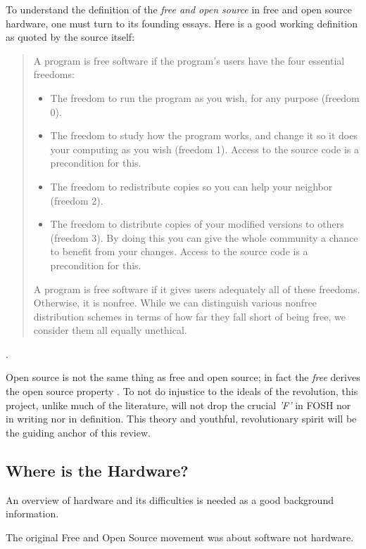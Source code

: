 \documentclass{article}
\begin{document}
To understand the definition of the \textit{free and open source} in free and open source hardware, one must turn to its founding essays. Here is a good working definition as quoted by the source itself:

\begin{quote}
    A program is free software if the program’s users have the four essential freedoms:

    \begin{itemize}
        \item The freedom to run the program as you wish, for any purpose (freedom 0).
        \item The freedom to study how the program works, and change it so it does your computing as you wish (freedom 1). 
            Access to the source code is a precondition for this.
        \item The freedom to redistribute copies so you can help your neighbor (freedom 2).
        \item The freedom to distribute copies of your modified versions to others (freedom 3). 
            By doing this you can give the whole community a chance to benefit from your changes. Access to the source code is a precondition for this.
    \end{itemize}
    A program is free software if it gives users adequately all of these freedoms. Otherwise, it is nonfree. 
    While we can distinguish various nonfree distribution schemes in terms of how far they fall short of being free, we consider them all equally unethical.
\end{quote} \cite{b0_stallman}.

Open source is not the same thing as free and open source; in fact the \textit{free} derives the open source property \cite{b0_stallman}. 
To not do injustice to the ideals of the revolution, this project, unlike much of the literature, will not drop the crucial \textit{'F'} in FOSH nor in writing nor in definition.
This theory and youthful, revolutionary spirit will be the guiding anchor of this review.

\subsection{Where is the Hardware?}
An overview of hardware and its difficulties is needed as a good background information. 

The original Free and Open Source movement was about software not hardware.
\end{document}
